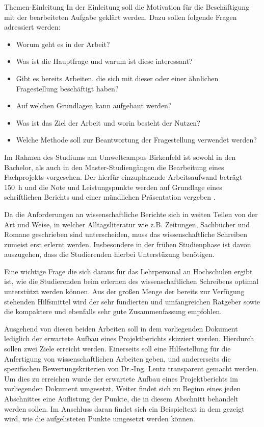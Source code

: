 %
\begin{simplebox}{Themen-Einleitung}
%
In der Einleitung soll die Motivation für die Beschäftigung mit der bearbeiteten Aufgabe geklärt werden.
Dazu sollen folgende Fragen adressiert werden:
%
\begin{itemize}
\item Worum geht es in der Arbeit? 
\item Was ist die Hauptfrage und warum ist diese interessant?
\item Gibt es bereits Arbeiten, die sich mit dieser oder einer ähnlichen Fragestellung beschäftigt haben?
\item Auf welchen Grundlagen kann aufgebaut werden?
\item Was ist das Ziel der Arbeit und worin besteht der Nutzen?
\item Welche Methode soll zur Beantwortung der Fragestellung verwendet werden?
\end{itemize}
%
%
\end{simplebox}
%
Im Rahmen des Studiums am Umweltcampus Birkenfeld ist sowohl in den Bachelor, als auch in den Master-Studiengängen die Bearbeitung eines Fachprojekts vorgesehen.
Der hierfür einzuplanende Arbeitsaufwand beträgt \SI{150}{\hour} und die Note und Leistungspunkte werden auf Grundlage eines schriftlichen Berichts und einer mündlichen Präsentation vergeben \cite{modulhandbuch}.
\par
Da die Anforderungen an wissenschaftliche Berichte sich in weiten Teilen von der Art und Weise, in welcher Alltagsliteratur wie z.B. Zeitungen, Sachbücher und Romane geschrieben sind unterscheiden, muss das wissenschaftliche Schreiben zumeist erst erlernt werden. 
Insbesondere in der frühen Studienphase ist davon auszugehen, dass die Studierenden hierbei Unterstüzung benötigen.
\par
Eine wichtige Frage die sich daraus für das Lehrpersonal an Hochschulen ergibt ist, wie die Studierenden beim erlernen des wissenschaftlichen Schreibens optimal unterstützt werden können.
Aus der großen Menge der bereits zur Verfügung stehenden Hilfsmittel wird der sehr fundierten und umfangreichen Ratgeber \cite{teHeesen} sowie die kompaktere und ebenfalls sehr gute Zusammenfassung \cite{Rumpler} empfohlen.
\par 
Ausgehend von diesen beiden Arbeiten soll in dem vorliegenden Dokument lediglich der erwartete Aufbau eines Projektberichts skizziert werden.
Hierdurch sollen zwei Ziele erreicht werden.
Einerseits soll eine Hilfestellung für die Anfertigung von wissenschaftlichen Arbeiten geben, und andererseits die spezifischen Bewertungskriterien von Dr.-Ing. Lentz transparent gemacht werden.
Um dies zu erreichen wurde der erwartete Aufbau eines Projektberichts im vorliegenden Dokument umgesetzt.  
Weiter findet sich zu Beginn eines jeden Abschnittes eine Auflistung der Punkte, die in diesem Abschnitt behandelt werden sollen.
Im Anschluss daran findet sich ein Beispieltext in dem gezeigt wird, wie die aufgelisteten Punkte umgesetzt werden können. 
%